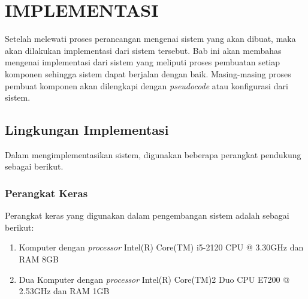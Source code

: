 \chapter{IMPLEMENTASI}
Setelah melewati proses perancangan mengenai sistem yang akan dibuat, maka akan dilakukan implementasi dari sistem tersebut. Bab ini akan membahas mengenai implementasi dari sistem yang meliputi proses pembuatan setiap komponen sehingga sistem dapat berjalan dengan baik. Masing-masing proses pembuat komponen akan dilengkapi dengan \textit{pseudocode} atau konfigurasi dari sistem.  
\section{Lingkungan Implementasi}
  	Dalam mengimplementasikan sistem, digunakan beberapa perangkat pendukung sebagai berikut.
    \subsection{Perangkat Keras}
    Perangkat keras yang digunakan dalam pengembangan sistem adalah sebagai berikut:
    \begin{enumerate}
    \item Komputer dengan \textit{processor} Intel(R) Core(TM) i5-2120 CPU @ 3.30GHz dan RAM 8GB
    \item Dua Komputer dengan \textit{processor} Intel(R) Core(TM)2 Duo CPU E7200 @ 2.53GHz dan RAM 1GB
    \end{enumerate}
